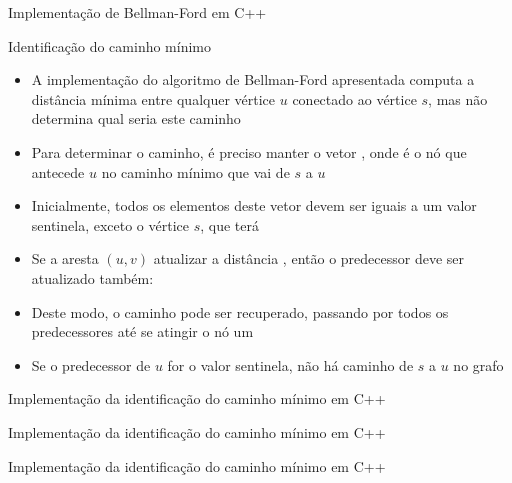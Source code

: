 \begin{frame}[fragile]{Implementação de Bellman-Ford em C++}
\end{frame}


\begin{frame}[fragile]{Identificação do caminho mínimo}

    \begin{itemize}
        \item A implementação do algoritmo de Bellman-Ford apresentada computa a distância
            mínima entre qualquer vértice $u$ conectado ao vértice $s$, mas não determina
            qual seria este caminho

        \item Para determinar o caminho, é preciso manter o vetor , onde
             é o nó que antecede $u$ no caminho mínimo que vai de $s$ a 
            $u$

        \item Inicialmente, todos os elementos deste vetor devem ser iguais a um valor sentinela,
            exceto o vértice $s$, que terá 

        \item Se a aresta $(u, v)$ atualizar a distância , então o 
            predecessor deve ser atualizado também: 

        \item Deste modo, o caminho pode ser recuperado, passando por todos os predecessores até
            se atingir o nó um

        \item Se o predecessor de $u$ for o valor sentinela, não há caminho de $s$ a $u$ no
            grafo
    \end{itemize}

\end{frame}

\begin{frame}[fragile]{Implementação da identificação do caminho mínimo em C++}
\end{frame}

\begin{frame}[fragile]{Implementação da identificação do caminho mínimo em C++}
\end{frame}

\begin{frame}[fragile]{Implementação da identificação do caminho mínimo em C++}
\end{frame}

